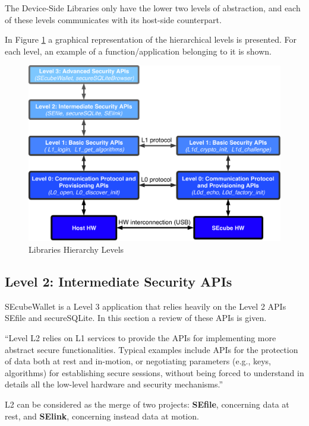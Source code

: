 The Device-Side Libraries only have the lower two levels of abstraction, and each of these levels communicates with its host-side counterpart.

In Figure \ref{fig:levels} a graphical representation of the hierarchical levels is presented. For each level, an example of a function/application belonging to it is shown.

\begin{figure}[htb]
  \centering
  \captionsetup{justification=centering}
  \centerline{\includegraphics[width=\columnwidth]{chapters/figures/frameworks/levels.pdf}}
  \caption{Libraries Hierarchy Levels}
  \label{fig:levels}
\end{figure}

\subsection{Level 2: Intermediate Security APIs}

SEcubeWallet is a Level 3 application that relies heavily on the Level 2 APIs SEfile and secureSQLite. In this section a review of these APIs is given.

``Level L2 relies on L1 services to provide the APIs for implementing more abstract secure functionalities. Typical examples include APIs for the protection of data both at rest and in-motion, or negotiating parameters (e.g., keys, algorithms) for establishing secure sessions, without being forced to understand in details all the low-level hardware and security mechanisms.''\cite{L2UserMan}

L2 can be considered as the merge of two projects: \textbf{SEfile}, concerning data at rest, and \textbf{SElink}, concerning instead data at motion. 

